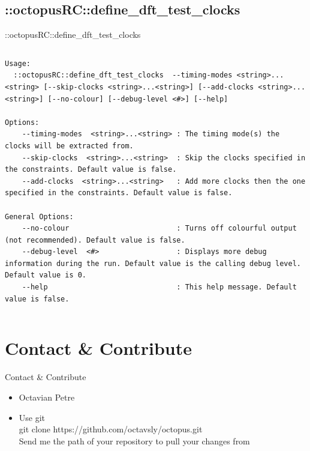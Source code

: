 \documentclass[handout]{beamer}
\begin{document}
\subsection{::octopusRC::define\_dft\_test\_clocks}
\begin{frame}{::octopusRC::define\_dft\_test\_clocks}
\begin{columns}
\begin{column}{1.1\textwidth}
	\tiny
	\begin{verbatim}
Usage:
  ::octopusRC::define_dft_test_clocks  --timing-modes <string>...<string> [--skip-clocks <string>...<string>] [--add-clocks <string>...<string>] [--no-colour] [--debug-level <#>] [--help]

Options:
    --timing-modes  <string>...<string> : The timing mode(s) the clocks will be extracted from.
    --skip-clocks  <string>...<string>  : Skip the clocks specified in the constraints. Default value is false.
    --add-clocks  <string>...<string>   : Add more clocks then the one specified in the constraints. Default value is false.

General Options:
    --no-colour                         : Turns off colourful output (not recommended). Default value is false.
    --debug-level  <#>                  : Displays more debug information during the run. Default value is the calling debug level. Default value is 0.
    --help                              : This help message. Default value is false.
	\end{verbatim}
  
\end{column}
\end{columns}
\end{frame}


\section{Contact \& Contribute}
\begin{frame}{Contact \& Contribute}
	\begin{itemize}[<+->]
	\item Octavian Petre
	\item Use git \\
	\alert{git clone https://github.com/octavsly/octopus.git}\\
	Send me the path of your repository to pull your changes from
	\end{itemize}
\end{frame}
\end{document}
